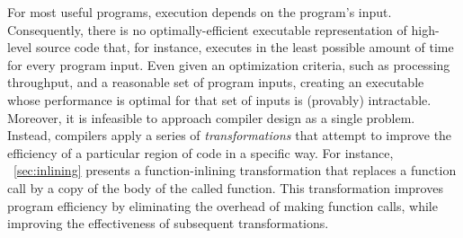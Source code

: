 


For most useful programs, execution depends on the program's input.
Consequently, there is no optimally-efficient executable
representation of high-level source code that, for instance, executes
in the least possible amount of time for every program input.  Even
given an optimization criteria, such as processing throughput, and a
reasonable set of program inputs, creating an executable whose
performance is optimal for that set of inputs is (provably)
intractable. Moreover, it is infeasible to approach compiler design as
a single problem.  Instead, compilers apply a series of {\it
transformations} that attempt to improve
the efficiency of a particular region of code in a specific way.  For
instance, ~\ref{sec:inlining} presents a function-inlining
transformation that replaces a function call by a copy of the body of
the called function. This transformation improves program efficiency
by eliminating the overhead of making function calls, while improving
the effectiveness of subsequent transformations.

